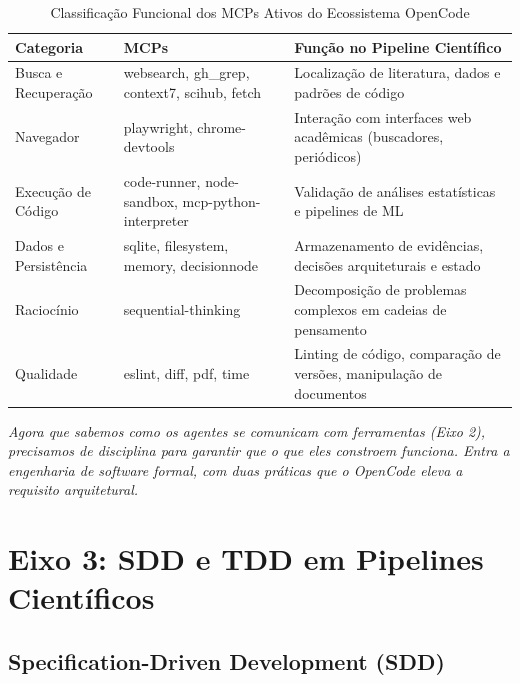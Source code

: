 \begin{table}[H]
\centering
\caption{Classificação Funcional dos MCPs Ativos do Ecossistema OpenCode}
\label{tab:mcps}
\begin{tabular}{p{3cm}p{4cm}p{7cm}}
\toprule
\textbf{Categoria} & \textbf{MCPs} & \textbf{Função no Pipeline Científico} \\
\midrule
Busca e Recuperação & websearch, gh\_grep, context7, scihub, fetch & Localização de literatura, dados e padrões de código \\
\addlinespace
Navegador & playwright, chrome-devtools & Interação com interfaces web acadêmicas (buscadores, periódicos) \\
\addlinespace
Execução de Código & code-runner, node-sandbox, mcp-python-interpreter & Validação de análises estatísticas e pipelines de ML \\
\addlinespace
Dados e Persistência & sqlite, filesystem, memory, decisionnode & Armazenamento de evidências, decisões arquiteturais e estado \\
\addlinespace
Raciocínio & sequential-thinking & Decomposição de problemas complexos em cadeias de pensamento \\
\addlinespace
Qualidade & eslint, diff, pdf, time & Linting de código, comparação de versões, manipulação de documentos \\
\bottomrule
\end{tabular}
\end{table}

{\small\itshape Agora que sabemos como os agentes se comunicam com ferramentas (Eixo 2), precisamos de disciplina para garantir que o que eles constroem funciona. Entra a engenharia de software formal, com duas práticas que o OpenCode eleva a requisito arquitetural.}

\section{Eixo 3: SDD e TDD em Pipelines Científicos}

\subsection{Specification-Driven Development (SDD)}

